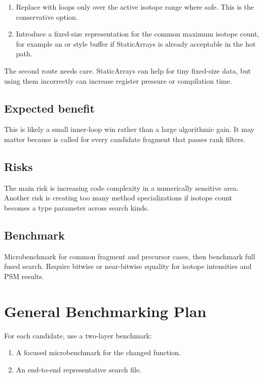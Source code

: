 \documentclass[11pt]{article}
\begin{document}
\begin{enumerate}
  \item Replace  with loops only over the active
        isotope range where safe. This is the conservative option.
  \item Introduce a fixed-size representation for the common maximum isotope
        count, for example an  or  style buffer if
        StaticArrays is already acceptable in the hot path.
\end{enumerate}

The second route needs care. StaticArrays can help for tiny fixed-size data, but
using them incorrectly can increase register pressure or compilation time.

\subsection*{Expected benefit}

This is likely a small inner-loop win rather than a large algorithmic gain. It
may matter because  is called for every candidate
fragment that passes rank filters.

\subsection*{Risks}

The main risk is increasing code complexity in a numerically sensitive area.
Another risk is creating too many method specializations if isotope count
becomes a type parameter across search kinds.

\subsection*{Benchmark}

Microbenchmark  for common fragment and precursor cases,
then benchmark full fused search. Require bitwise or near-bitwise equality for
isotope intensities and PSM results.

\section*{General Benchmarking Plan}

For each candidate, use a two-layer benchmark:

\begin{enumerate}
  \item A focused microbenchmark for the changed function.
  \item An end-to-end representative search file.
\end{enumerate}
\end{document}
